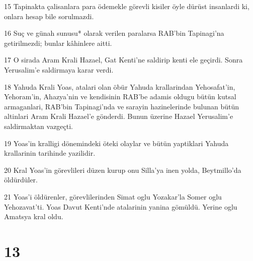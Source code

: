 \par 15 Tapinakta çalisanlara para ödemekle görevli kisiler öyle dürüst insanlardi ki, onlara hesap bile sorulmazdi.
\par 16 Suç ve günah sunusu* olarak verilen paralarsa RAB'bin Tapinagi'na getirilmezdi; bunlar kâhinlere aitti.
\par 17 O sirada Aram Krali Hazael, Gat Kenti'ne saldirip kenti ele geçirdi. Sonra Yerusalim'e saldirmaya karar verdi.
\par 18 Yahuda Krali Yoas, atalari olan öbür Yahuda krallarindan Yehosafat'in, Yehoram'in, Ahazya'nin ve kendisinin RAB'be adamis oldugu bütün kutsal armaganlari, RAB'bin Tapinagi'nda ve sarayin hazinelerinde bulunan bütün altinlari Aram Krali Hazael'e gönderdi. Bunun üzerine Hazael Yerusalim'e saldirmaktan vazgeçti.
\par 19 Yoas'in kralligi dönemindeki öteki olaylar ve bütün yaptiklari Yahuda krallarinin tarihinde yazilidir.
\par 20 Kral Yoas'in görevlileri düzen kurup onu Silla'ya inen yolda, Beytmillo'da öldürdüler.
\par 21 Yoas'i öldürenler, görevlilerinden Simat oglu Yozakar'la Somer oglu Yehozavat'ti. Yoas Davut Kenti'nde atalarinin yanina gömüldü. Yerine oglu Amatsya kral oldu.

\chapter{13}

